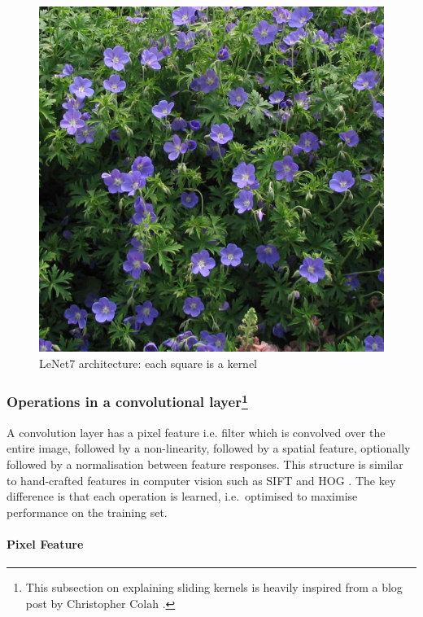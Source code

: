 \documentclass[a4paper,11pt]{article}
\begin{document}
\begin{figure}[h!]
	\centering
	\includegraphics[scale=0.2]{images/geranium.jpg}
	\caption{LeNet7 architecture: each square is a kernel}
\end{figure}

\subsubsection{Operations in a convolutional layer\footnote{This subsection on explaining sliding kernels is heavily inspired from a blog post by Christopher Colah \cite{colah}.}} 

A convolution layer has a pixel feature i.e. filter which is convolved over the entire image, followed by a non-linearity, followed by a spatial feature, optionally followed by a normalisation between feature responses. This structure is similar to hand-crafted features in computer vision such as SIFT and HOG \cite{SIFT}. The key difference is that each operation is learned, i.e.\ optimised to maximise performance on the training set. \\

\paragraph{Pixel Feature}
\end{document}
